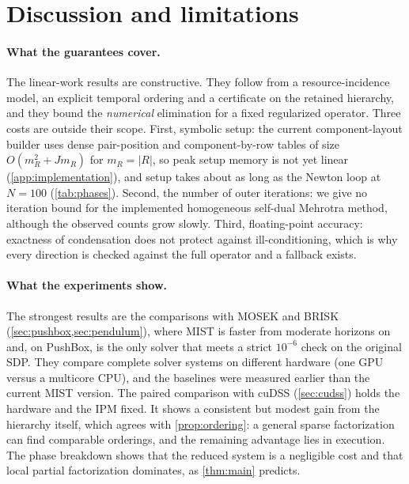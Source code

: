 \section{Discussion and limitations}\label{sec:discussion}

\paragraph{What the guarantees cover.}
The linear-work results are constructive. They follow from a resource-incidence
model, an explicit temporal ordering and a certificate on the retained
hierarchy, and they bound the \emph{numerical} elimination for a fixed
regularized operator. Three costs are outside their scope. First, symbolic
setup: the current component-layout builder uses dense pair-position and
component-by-row tables of size $O(m_R^2+Jm_R)$ for $m_R=|R|$, so peak setup
memory is not yet linear (\cref{app:implementation}), and setup takes about as
long as the Newton loop at $N=100$ (\cref{tab:phases}). Second, the number of
outer iterations: we give no iteration bound for the implemented homogeneous
self-dual Mehrotra method, although the observed counts grow slowly. Third,
floating-point accuracy: exactness of condensation does not protect against
ill-conditioning, which is why every direction is checked against the full
operator and a fallback exists.

\paragraph{What the experiments show.}
The strongest results are the comparisons with MOSEK and BRISK
(\cref{sec:pushbox,sec:pendulum}), where MIST is faster from moderate horizons
on and, on PushBox, is the only solver that meets a strict $10^{-6}$ check on the
original SDP. They compare complete solver systems on different hardware (one
GPU versus a multicore CPU), and the baselines were measured earlier than the
current MIST version. The paired comparison with cuDSS (\cref{sec:cudss}) holds
the hardware and the IPM fixed. It shows a consistent but modest gain from the
hierarchy itself, which agrees with \cref{prop:ordering}: a general sparse
factorization can find comparable orderings, and the remaining advantage lies in
execution. The phase breakdown shows that the reduced system is a negligible
cost and that local partial factorization dominates, as \cref{thm:main}
predicts.

